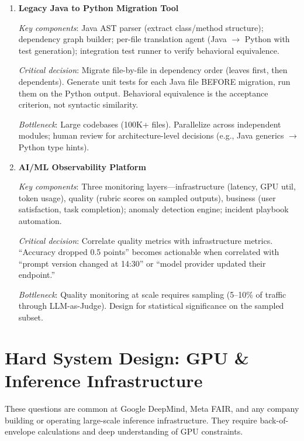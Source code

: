 \begin{enumerate}[leftmargin=*]
    \textit{Bottleneck}: End-to-end latency budget is $\sim$500ms. ASR (200ms) + Translation (100ms) + TTS (200ms) = 500ms. No room for LLM reasoning.

    \item[Q39.] \textbf{Legacy Java to Python Migration Tool}

    \textit{Key components}: Java AST parser (extract class/method structure); dependency graph builder; per-file translation agent (Java $\to$ Python with test generation); integration test runner to verify behavioral equivalence.

    \textit{Critical decision}: Migrate file-by-file in dependency order (leaves first, then dependents). Generate unit tests for each Java file BEFORE migration, run them on the Python output. Behavioral equivalence is the acceptance criterion, not syntactic similarity.

    \textit{Bottleneck}: Large codebases (100K+ files). Parallelize across independent modules; human review for architecture-level decisions (e.g., Java generics $\to$ Python type hints).

    \item[Q40.] \textbf{AI/ML Observability Platform}

    \textit{Key components}: Three monitoring layers---infrastructure (latency, GPU util, token usage), quality (rubric scores on sampled outputs), business (user satisfaction, task completion); anomaly detection engine; incident playbook automation.

    \textit{Critical decision}: Correlate quality metrics with infrastructure metrics. ``Accuracy dropped 0.5 points'' becomes actionable when correlated with ``prompt version changed at 14:30'' or ``model provider updated their endpoint.''

    \textit{Bottleneck}: Quality monitoring at scale requires sampling (5--10\% of traffic through LLM-as-Judge). Design for statistical significance on the sampled subset.
\end{enumerate}


\section{Hard System Design: GPU \& Inference Infrastructure}
\label{sec:hard-gpu}

These questions are common at Google DeepMind, Meta FAIR, and any company building or operating large-scale inference infrastructure. They require back-of-envelope calculations and deep understanding of GPU constraints.

